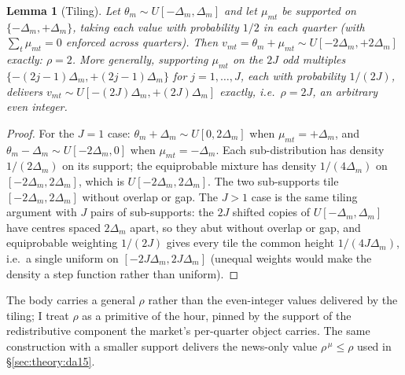 \documentclass[11pt,a4paper]{article}
\newtheorem{lemma}{Lemma}
\theoremstyle{definition}
\theoremstyle{remark}
\theoremstyle{plain}
\begin{document}
\begin{lemma}[Tiling]\label{lem:tiling}
Let $\theta_m \sim U[-\Delta_m, \Delta_m]$ and let $\mu_{mt}$ be supported on $\{-\Delta_m, +\Delta_m\}$, taking each value with probability $1/2$ in each quarter (with $\sum_t \mu_{mt} = 0$ enforced across quarters). Then $v_{mt} = \theta_m + \mu_{mt} \sim U[-2\Delta_m, +2\Delta_m]$ exactly: $\rho = 2$. More generally, supporting $\mu_{mt}$ on the $2J$ odd multiples $\{-(2j-1)\Delta_m, +(2j-1)\Delta_m\}$ for $j = 1, \dots, J$, each with probability $1/(2J)$, delivers $v_{mt} \sim U[-(2J)\Delta_m, +(2J)\Delta_m]$ exactly, i.e.\ $\rho = 2J$, an arbitrary even integer.
\end{lemma}

\begin{proof}
For the $J = 1$ case: $\theta_m + \Delta_m \sim U[0, 2\Delta_m]$ when $\mu_{mt} = +\Delta_m$, and $\theta_m - \Delta_m \sim U[-2\Delta_m, 0]$ when $\mu_{mt} = -\Delta_m$. Each sub-distribution has density $1/(2\Delta_m)$ on its support; the equiprobable mixture has density $1/(4\Delta_m)$ on $[-2\Delta_m, 2\Delta_m]$, which is $U[-2\Delta_m, 2\Delta_m]$. The two sub-supports tile $[-2\Delta_m, 2\Delta_m]$ without overlap or gap. The $J > 1$ case is the same tiling argument with $J$ pairs of sub-supports: the $2J$ shifted copies of $U[-\Delta_m,\Delta_m]$ have centres spaced $2\Delta_m$ apart, so they abut without overlap or gap, and equiprobable weighting $1/(2J)$ gives every tile the common height $1/(4J\Delta_m)$, i.e.\ a single uniform on $[-2J\Delta_m, 2J\Delta_m]$ (unequal weights would make the density a step function rather than uniform).
\end{proof}

The body carries a general $\rho$ rather than the even-integer values delivered by the tiling; I treat $\rho$ as a primitive of the hour, pinned by the support of the redistributive component the market's per-quarter object carries. The same construction with a smaller support delivers the news-only value $\rho^{\,\mu} \le \rho$ used in \S\ref{sec:theory:da15}.
\end{document}
